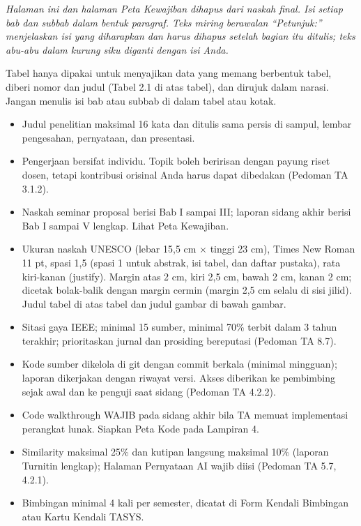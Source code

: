 
\begingroup\itshape
\noindent Halaman ini dan halaman Peta Kewajiban dihapus dari naskah final. Isi setiap bab dan subbab dalam bentuk paragraf. Teks miring berawalan ``Petunjuk:'' menjelaskan isi yang diharapkan dan harus dihapus setelah bagian itu ditulis; teks abu-abu dalam kurung siku diganti dengan isi Anda.\par
\vspace{4pt}
\noindent Tabel hanya dipakai untuk menyajikan data yang memang berbentuk tabel, diberi nomor dan judul (Tabel 2.1 di atas tabel), dan dirujuk dalam narasi. Jangan menulis isi bab atau subbab di dalam tabel atau kotak.\par
\endgroup
\vspace{6pt}

\begin{itemize}[leftmargin=0.53cm,itemsep=3pt,topsep=0pt,parsep=0pt]
\item Judul penelitian maksimal 16 kata dan ditulis sama persis di sampul, lembar pengesahan, pernyataan, dan presentasi.
\item Pengerjaan bersifat individu. Topik boleh beririsan dengan payung riset dosen, tetapi kontribusi orisinal Anda harus dapat dibedakan (Pedoman TA 3.1.2).
\item Naskah seminar proposal berisi Bab I sampai III; laporan sidang akhir berisi Bab I sampai V lengkap. Lihat Peta Kewajiban.
\item Ukuran naskah UNESCO (lebar 15,5 cm $\times$ tinggi 23 cm), Times New Roman 11 pt, spasi 1,5 (spasi 1 untuk abstrak, isi tabel, dan daftar pustaka), rata kiri-kanan (justify). Margin atas 2 cm, kiri 2,5 cm, bawah 2 cm, kanan 2 cm; dicetak bolak-balik dengan margin cermin (margin 2,5 cm selalu di sisi jilid). Judul tabel di atas tabel dan judul gambar di bawah gambar.
\item Sitasi gaya IEEE; minimal 15 sumber, minimal 70\% terbit dalam 3 tahun terakhir; prioritaskan jurnal dan prosiding bereputasi (Pedoman TA 8.7).
\item Kode sumber dikelola di git dengan commit berkala (minimal mingguan); laporan dikerjakan dengan riwayat versi. Akses diberikan ke pembimbing sejak awal dan ke penguji saat sidang (Pedoman TA 4.2.2).
\item Code walkthrough WAJIB pada sidang akhir bila TA memuat implementasi perangkat lunak. Siapkan Peta Kode pada Lampiran 4.
\item Similarity maksimal 25\% dan kutipan langsung maksimal 10\% (laporan Turnitin lengkap); Halaman Pernyataan AI wajib diisi (Pedoman TA 5.7, 4.2.1).
\item Bimbingan minimal 4 kali per semester, dicatat di Form Kendali Bimbingan atau Kartu Kendali TASYS.
\end{itemize}

